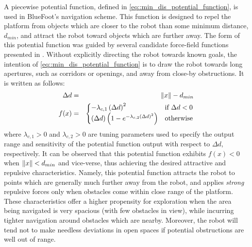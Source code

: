 			A piecewise potential function, defined in \ref{eq::min_dis_potential_function}, is used in BlueFoot's navigation scheme. This function is designed to repel the platform from objects which are closer to the robot than some minimum distance, $d_{min}$, and attract the robot toward objects which are further away. The form of this potential function was guided by several candidate force-field functions presented in \cite{ArambulaCosio2004}. Without explicitly directing the robot towards known goals, the intention of \ref{eq::min_dis_potential_function} is to draw the robot towards long apertures, such as corridors or openings, and away from close-by obstructions. It is written as follows:
				\begin{eqnarray}
					\Delta d &=& \left\lVert x\right\rVert-d_{min} \nonumber \\
					f(x) &=& 
					\begin{cases}	
					 	 -\lambda_{c,1} \left(\Delta d\right)^{2} &  \text{if } \Delta d < 0 \\
						\left(\Delta d\right) \left( 1  - e^{ -  \lambda_{c,2} { \left(\Delta d\right) }^{2} } \right) 	&  \text{otherwise}
					\end{cases}
				\label{eq::min_dis_potential_function}
				\end{eqnarray}
			where $\lambda_{c,1}>0$ and $\lambda_{c,2}>0$ are tuning parameters used to specify the output range and sensitivity of the potential function output with respect to $\Delta d$, respectively. It can be observed that this potential function exhibits $f(x)<0$ when $\left\lVert x\right\rVert < d_{min}$ and vice-verse, thus achieving the desired attractive and repulsive characteristics. Namely, this potential function attracts the robot to points which are generally much further away from the robot, and applies \emph{strong} repulsive forces only when obstacles come within close range of the platform. These characteristics offer a higher propensity for exploration when the area being navigated is very spacious (with few obstacles in view), while incurring tighter navigation around obstacles which are nearby. Moreover, the robot will tend not to make needless deviations in open spaces if potential obstructions are well out of range.

